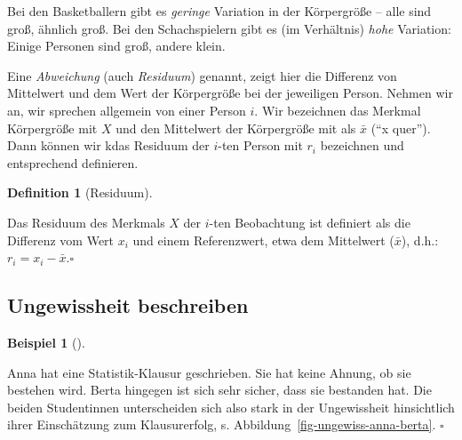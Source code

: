 \documentclass[
  letterpaper,
  twoside,
  open=any]{scrbook}
\theoremstyle{definition}
\newtheorem{definition}{Definition}[chapter]
\theoremstyle{definition}
\theoremstyle{definition}
\newtheorem{example}{Beispiel}[chapter]
\theoremstyle{remark}
\begin{document}
Bei den Basketballern gibt es \emph{geringe} Variation in der
Körpergröße -- alle sind groß, ähnlich groß. Bei den Schachspielern gibt
es (im Verhältnis) \emph{hohe} Variation: Einige Personen sind groß,
andere klein.

Eine \emph{Abweichung} (auch \emph{Residuum}) genannt, zeigt hier die
Differenz von Mittelwert und dem Wert der Körpergröße bei der jeweiligen
Person. Nehmen wir an, wir sprechen allgemein von einer Person \(i\).
Wir bezeichnen das Merkmal Körpergröße mit \(X\) und den Mittelwert der
Körpergröße mit als \(\bar{x}\) (\enquote{x quer}). Dann können wir kdas
Residuum der \(i\)-ten Person mit \(r_i\) bezeichnen und entsprechend
definieren.

\begin{definition}[Residuum]\protect\hypertarget{def-residuum}{}\label{def-residuum}

Das Residuum des Merkmals \(X\) der \(i\)-ten Beobachtung ist definiert
als die Differenz vom Wert \(x_i\) und einem Referenzwert, etwa dem
Mittelwert (\(\bar{x}\)), d.h.: \(r_i = x_i - \bar{x}.\square\)

\end{definition}

\subsection{Ungewissheit beschreiben}\label{ungewissheit-beschreiben}

\begin{example}[]\protect\hypertarget{exm-ungewiss1}{}\label{exm-ungewiss1}

Anna hat eine Statistik-Klausur geschrieben. Sie hat keine Ahnung, ob
sie bestehen wird. Berta hingegen ist sich sehr sicher, dass sie
bestanden hat. Die beiden Studentinnen unterscheiden sich also stark in
der Ungewissheit hinsichtlich ihrer Einschätzung zum Klausurerfolg, s.
Abbildung~\ref{fig-ungewiss-anna-berta}. \(\square\)

\end{example}
\end{document}
